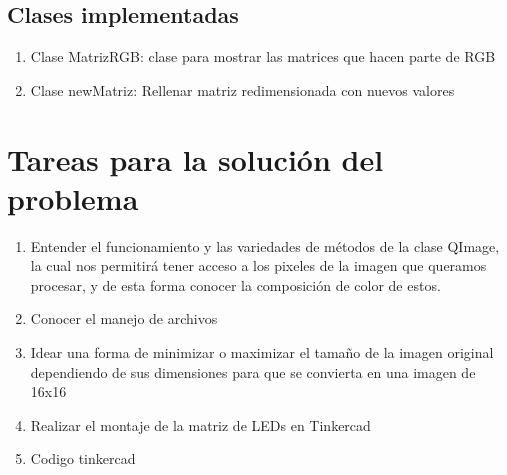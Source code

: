 \documentclass{article}
\begin{document}
\subsection{Clases implementadas}
\begin{enumerate}
\item Clase MatrizRGB: clase para mostrar las matrices que hacen parte de RGB
\item Clase newMatriz: Rellenar matriz redimensionada con nuevos valores


\end{enumerate}

\section{Tareas para la solución del problema} \label{tareas}
\begin{enumerate}
\item Entender el funcionamiento y las variedades de métodos de la clase QImage, la cual nos permitirá tener acceso a los pixeles de la imagen que queramos procesar, y de esta forma conocer la composición de color de estos.
\item Conocer el manejo de archivos
\item Idear una forma de minimizar o maximizar el tamaño de la imagen original dependiendo de sus dimensiones para que se convierta en una imagen de 16x16
\item Realizar el montaje de la matriz de LEDs en Tinkercad
\item Codigo tinkercad


\end{enumerate}

\newpage
\end{document}
